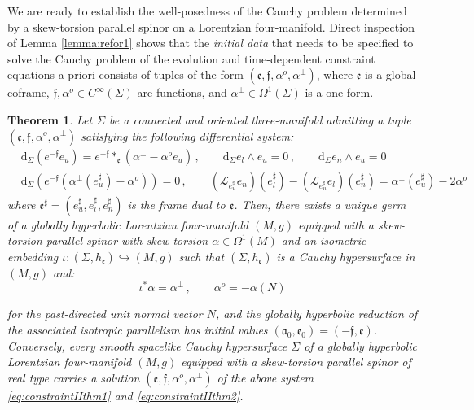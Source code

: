 \documentclass[10pt,reqno,a4paper]{amsart}
\theoremstyle{plain}
\newtheorem{thm}{Theorem}[section]
\theoremstyle{definition}
\theoremstyle{remark}
\theoremstyle{remark}
\def\dd{\mathrm{d}}
\def\cL{\mathcal{L}}
\def\cL{\mathcal{L}}
\def\fra{\mathfrak{a}}
\def\fre{\mathfrak{e}}
\renewcommand{\(}{ (}
\renewcommand{\)}{ )}
\newcommand{\frf}{\mathfrak{f}}
\begin{document}
\noindent
We are ready to establish the well-posedness of the Cauchy problem determined by a skew-torsion parallel spinor on a Lorentzian four-manifold. Direct inspection of Lemma \ref{lemma:refor1} shows that the \emph{initial data} that needs to be specified to solve the Cauchy problem of the evolution and time-dependent constraint equations a priori consists of tuples of the form $(\fre,\frf,\alpha^o,\alpha^{\perp})$, where $\fre$ is a global coframe, $\frf , \alpha^o \in C^{\infty}(\Sigma)$ are functions, and $\alpha^{\perp} \in \Omega^1(\Sigma)$ is a one-form.  


\begin{thm}
\label{thm:wellposedFinalSkew}
Let $\Sigma$ be a connected and oriented three-manifold admitting a tuple $(\fre,\frf,\alpha^o,\alpha^{\perp})$ satisfying the following differential system: 
 \begin{eqnarray}
& \dd_{\Sigma} ( e^{-\frf} e_{u}) = e^{-\frf} \ast_{\fre} (\alpha^{\perp}   - \alpha^o e_{u})  \, , \qquad \dd_{\Sigma} e_{l} \wedge e_{u} = 0 \, , \qquad \dd_{\Sigma} e_{n} \wedge e_{u} = 0 \label{eq:constraintIIthm1} \\
& \dd_{\Sigma} (e^{-\frf}(\alpha^{\perp}(e_u^{\sharp}) - \alpha^o)) = 0\, , \qquad   (\cL_{e_{u}^{\sharp}}e_{n})(e_{l}^{\sharp}) - (\cL_{e_{u}^{\sharp}}e_{l})(e_{n}^{\sharp}) = \alpha^{\perp}(e_{u}^{\sharp}) - 2\alpha^o  \label{eq:constraintIIthm2}
\end{eqnarray}
where $\fre^{\sharp} = (e^{\sharp}_u,e^{\sharp}_l,e^{\sharp}_n)$ is the frame dual to $\fre$. Then, there exists a unique germ of a globally hyperbolic Lorentzian four-manifold $(M,g)$ equipped with a skew-torsion parallel spinor with skew-torsion $\alpha \in \Omega^1(M)$ and an isometric embedding $\iota\colon (\Sigma,h_{\fre})\hookrightarrow (M,g)$ such that $(\Sigma,h_{\fre})$ is a Cauchy hypersurface in $(M,g)$ and:
\begin{equation*}
\iota^{\ast}\alpha = \alpha^{\perp}\, , \qquad \alpha^o = - \alpha(N)
\end{equation*}

\noindent
for the past-directed unit normal vector $N$, and the globally hyperbolic reduction of the associated isotropic parallelism has initial values $(\fra_0,\fre_0)=(-\frf,\fre)$. Conversely, every smooth spacelike Cauchy hypersurface $\Sigma$ of a globally hyperbolic Lorentzian four-manifold $(M,g)$ equipped with a skew-torsion parallel spinor of real type carries a solution $(\fre,\frf,\alpha^o,\alpha^{\perp})$ of the above system \eqref{eq:constraintIIthm1} and \eqref{eq:constraintIIthm2}. 
\end{thm}   
\end{document}
